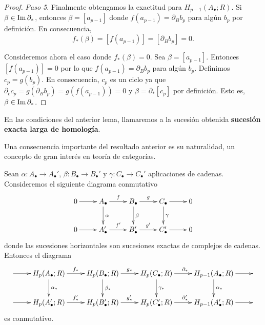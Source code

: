 \begin{proof}
	\textit{Paso 5}. Finalmente obtengamos la exactitud para
	$H_{p-1}(A_{\bullet};R)$. Si $\beta \in \operatorname{Im} \partial_{*}$, entonces
	$\beta = [a_{p-1}]$ donde $f(a_{p-1}) = \partial_{B}b_{p}$ para algún $b_{p}$
	por definición. En consecuencia,
	\[
	f_{*}(\beta) = [f(a_{p-1})] = [\partial_{B}b_{p}] = 0.
	\]
	
	Consideremos ahora el caso donde $f_{*}(\beta) = 0$. Sea $\beta = [a_{p-1}]$. Entonces
	$[f(a_{p-1})] = 0$ por lo que $f(a_{p-1}) = \partial_{B}b_{p}$ para algún $b_{p}$.
	Definimos $c_{p}= g(b_{p})$. En consecuencia, $c_{p}$ es un ciclo ya que
	$\partial_{c}c_{p}= g(\partial_{B}b_{p}) = g(f(a_{p-1})) = 0$ y
	$\beta = \partial_{*}[c_{p}]$ por definición. Esto es,
	$\beta \in \operatorname{Im} \partial_{*}$.
\end{proof}
\begin{definicion}
	En las condiciones del anterior lema, llamaremos a la sucesión obtenida
	\textbf{sucesión exacta larga de homología}.
\end{definicion}
Una consecuencia importante del resultado anterior es su naturalidad, un
concepto de gran interés en teoría de categorías.
\begin{teorema}
	Sean $\alpha : A_{\bullet} \to A_{\bullet}'$,
	$\beta : B_{\bullet} \to B_{\bullet}'$ y
	$\gamma : C_{\bullet} \to C_{\bullet}'$ aplicaciones de cadenas. Consideremos el
	siguiente diagrama conmutativo
	\[
	\xymatrix{ 0 \ar@{->}[r] & A_{\bullet} \ar@{->}[r]^{f} \ar@{->}[d]^{\alpha} & B_{\bullet} \ar@{->}[r]^{g} \ar@{->}[d]^{\beta} & C_{\bullet} \ar@{->}[r] \ar@{->}[d]^{\gamma} & 0 \\ 0 \ar@{->}[r] & A'_{\bullet} \ar@{->}[r]^{f'} & B'_{\bullet} \ar@{->}[r]^{g'} & C'_{\bullet} \ar@{->}[r] & 0 }
	\]
	donde las sucesiones horizontales son sucesiones exactas de complejos de cadenas.
	Entonces el diagrama
	\[
	\xymatrix{ {} \ar@{->}[r] & H_p(A_{\bullet};R) \ar@{->}[r]^{f_*} \ar@{->}[d]^{\alpha_*} & H_p(B_{\bullet};R) \ar@{->}[r]^{g_*} \ar@{->}[d]^{\beta_*} & H_p(C_{\bullet};R) \ar@{->}[r]^{\partial_*} \ar@{->}[d]^{\gamma_*} & H_{p-1}(A_{\bullet};R) \ar@{->}[r] \ar@{->}[d]^{\alpha_*} & {} \\ {} \ar@{->}[r] & H_p(A'_{\bullet};R) \ar@{->}[r]^{f'_*} & H_p(B'_{\bullet};R) \ar@{->}[r]^{g'_*} & H_p(C'_{\bullet};R) \ar@{->}[r]^{\partial'_*} & H_{p-1}(A'_{\bullet};R) \ar@{->}[r] & }
	\]
	es conmutativo.
\end{teorema}
